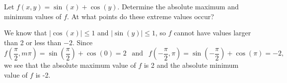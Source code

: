 \begin{activity} \label{A:10.7.2}Let $f(x,y) = \sin(x)+\cos(y)$. Determine the absolute maximum and minimum values of $f$. At what points do these extreme values occur?
\end{activity}
\begin{smallhint}

\end{smallhint}
\begin{bighint}

\end{bighint}
\begin{activitySolution}
We know that $|\cos(x)| \leq 1$ and $|\sin(y)| \leq 1$, so $f$ cannot have values larger than 2 or less than $-2$. Since 
\[f\left(\frac{\pi}{2},  m \pi\right) = \sin\left(\frac{\pi}{2}\right) + \cos(0) = 2 \ \ \text{ and } \ \ f\left(-\frac{\pi}{2},  \pi \right) = \sin\left(-\frac{\pi}{2}\right) + \cos(\pi) = -2,\]
we see that the absolute maximum value of $f$ is 2 and the absolute minimum value of $f$ is -2. 
\end{activitySolution}
\aftera
